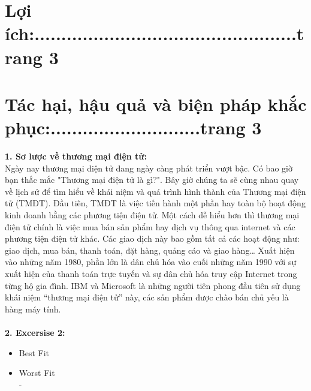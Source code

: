 \documentclass[13pt,a4paper]{article}
\begin{document}
\section{Lợi ích:.................................................trang 3}
\section{Tác hại, hậu quả và biện pháp khắc phục:............................trang 3}

	
	


\newpage
\fontsize{15pt}{1.2pt}
\textbf{\Large{1. Sơ lược về thương mại điện tử:}}
\\
\fontsize{13pt}{1.2cm}\selectfont %
Ngày nay thương mại điện tử đang ngày càng phát triển vượt bậc. Có bao giờ bạn thắc mắc "Thương mại điện tử là gì?". Bây giờ chúng ta sẽ cùng nhau quay về lịch sử để tìm hiểu về khái niệm và quá trình hình thành của Thương mại điện tử (TMĐT). Đầu tiên, TMĐT là việc tiến hành một phần hay toàn bộ hoạt động kinh doanh bằng các phương tiện điện tử. Một cách dễ hiểu hơn thì thương mại điện tử chính là việc mua bán sản phẩm hay dịch vụ thông qua internet và các phương tiện điện tử khác. Các giao dịch này bao gồm tất cả các hoạt động như: giao dịch, mua bán, thanh toán, đặt hàng, quảng cáo và giao hàng… 
Xuất hiện vào những năm 1980, phần lớn là dân chủ hóa vào cuối những năm 1990 với sự xuất hiện của thanh toán trực tuyến và sự dân chủ hóa truy cập Internet trong từng hộ gia đình.
IBM và Microsoft là những người tiên phong đầu tiên sử dụng khái niệm “thương mại điện tử” này, các sản phẩm được chào bán chủ yếu là hàng máy tính.
\\
\\
\Large\textbf{2. Excersise 2:}
\begin{itemize}
    \item Best Fit\\
    
   
    \item Worst Fit\\
     -
    
\end{itemize}
\end{document}
